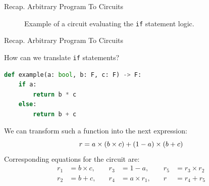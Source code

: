 \documentclass{zkdl-presentation-template}
\begin{document}
\begin{frame}{Recap. Arbitrary Program To Circuits}
\begin{figure}[h!]
             \caption{Example of a circuit evaluating the \texttt{if} statement logic.}
             \label{fig:multivariate-polynomial-circuit}
         \end{figure}
    \end{frame}

    \begin{frame}[fragile]{Recap. Arbitrary Program To Circuits}
        \begin{example}
            How can we translate \texttt{if} statements?
            \begin{lstlisting}[language=Python,numbers=none]
def example(a: bool, b: F, c: F) -> F:
    if a:
        return b * c 
    else:
        return b + c
            \end{lstlisting}
            \pause
            We can transform such a function into the next expression:
            \vspace{-8pt}
            \begin{equation*}
                r = a \times (b \times c) + (1 - a) \times (b + c)    
                \vspace{-8pt}
            \end{equation*}
            \pause
            Corresponding equations for the circuit are:
            \vspace{-8pt}
            \begin{equation*}
                \begin{aligned}
                    r_1 &= b \times c, \quad &r_3 &= 1 - a, \quad &r_5 &= r_3 \times r_2 \\
                    r_2 &= b + c, \quad &r_4 &= a \times r_1, \quad &r &= r_4 + r_5
                \end{aligned}
            \end{equation*}
        \end{example}
    \end{frame}
\end{document}
